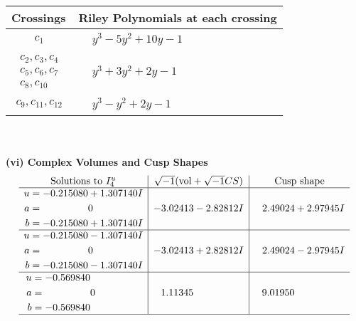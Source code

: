 \documentclass[1p]{elsarticle_modified}
\theoremstyle{definition}
\newcommand{\I}{\sqrt{-1}}
\begin{document}
\begin{tabular}{m{50pt}|m{274pt}}
Crossings & \hspace{64pt}Riley Polynomials at each crossing \\
\hline $$\begin{aligned}c_{1}\end{aligned}$$&$\begin{aligned}
&y^3-5 y^2+10 y-1
\end{aligned}$\\
\hline $$\begin{aligned}c_{2},c_{3},c_{4}\\c_{5},c_{6},c_{7}\\c_{8},c_{10}\end{aligned}$$&$\begin{aligned}
&y^3+3 y^2+2 y-1
\end{aligned}$\\
\hline $$\begin{aligned}c_{9},c_{11},c_{12}\end{aligned}$$&$\begin{aligned}
&y^3- y^2+2 y-1
\end{aligned}$\\
\hline
\end{tabular}\\~\\
\newpage\flushleft \textbf{(vi) Complex Volumes and Cusp Shapes}
$$\begin{array}{c|c|c}  
\text{Solutions to }I^u_{4}& \I (\text{vol} + \sqrt{-1}CS) & \text{Cusp shape}\\
 \hline 
\begin{aligned}
u &= -0.215080 + 1.307140 I \\
a &= \phantom{-0.000000 } 0 \\
b &= -0.215080 + 1.307140 I\end{aligned}
 & -3.02413 - 2.82812 I & \phantom{-}2.49024 + 2.97945 I \\ \hline\begin{aligned}
u &= -0.215080 - 1.307140 I \\
a &= \phantom{-0.000000 } 0 \\
b &= -0.215080 - 1.307140 I\end{aligned}
 & -3.02413 + 2.82812 I & \phantom{-}2.49024 - 2.97945 I \\ \hline\begin{aligned}
u &= -0.569840\phantom{ +0.000000I} \\
a &= \phantom{-0.000000 } 0 \\
b &= -0.569840\phantom{ +0.000000I}\end{aligned}
 & \phantom{-}1.11345\phantom{ +0.000000I} & \phantom{-}9.01950\phantom{ +0.000000I}\\
 \hline 
 \end{array}$$\newpage
\end{document}
